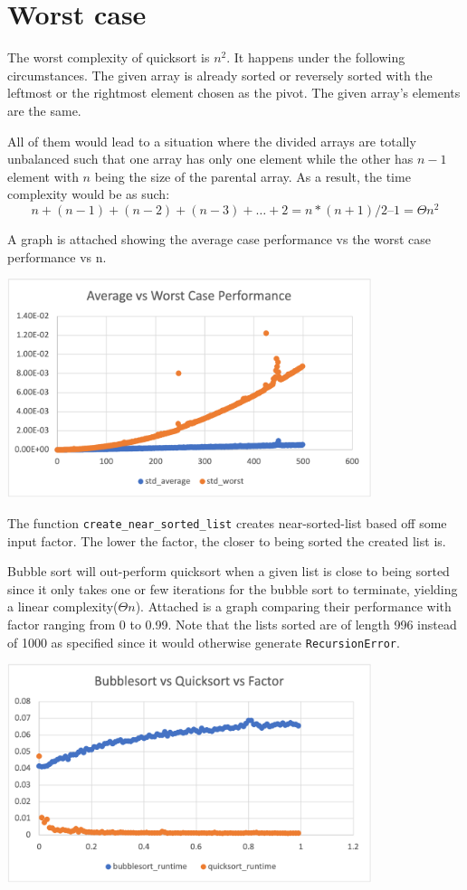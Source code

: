 \documentclass{article}
\begin{document}
\section*{Worst case}
The worst complexity of quicksort is $n^2$. It happens under the following 
circumstances. The given array is already sorted or reversely sorted with 
the leftmost or the rightmost element chosen as the pivot. The given array’s 
elements are the same.

All of them would lead to a situation where the divided arrays are totally 
unbalanced such that one array has only one element while the other has $n - 1$ 
element with $n$ being the size of the parental array. As a result, the time 
complexity would be as such:
\begin{equation*}
n + (n - 1) + (n - 2) + (n - 3) + … + 2 = n * (n + 1) / 2 – 1 = \Theta{n^2}
\end{equation*}

A graph is attached showing the average case performance vs the worst case performance vs n.

\includegraphics[width=0.8\textwidth]{average_vs_worst_case_performance}

\medskip
The function \verb|create_near_sorted_list| creates near-sorted-list based off 
some input factor. The lower the factor, the closer to being sorted the created list is.

Bubble sort will out-perform quicksort when a given list is close to being sorted 
since it only takes one or few iterations for the bubble sort to terminate, yielding 
a linear complexity($\Theta{n}$). Attached is a graph comparing their performance 
with factor ranging from 0 to 0.99. Note that the lists sorted are of length 996 
instead of 1000 as specified since it would otherwise generate \verb|RecursionError|.

\includegraphics[width=0.8\textwidth]{bubblesort_vs_quicksort_vs_factor}
\end{document}
